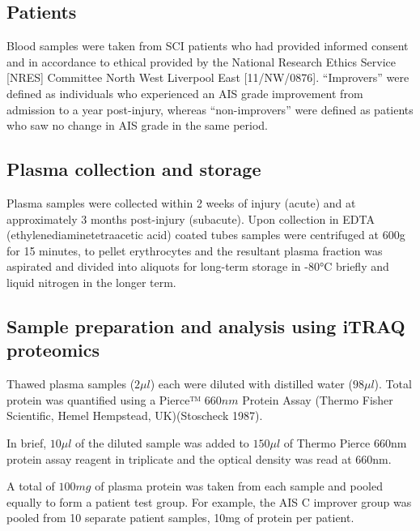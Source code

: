 \documentclass[9pt,lineno]{elife}
\begin{document}
\hypertarget{patients}{%
\subsection{Patients}\label{patients}}

Blood samples were taken from SCI patients who had provided informed consent and in accordance to ethical provided by the National Research Ethics Service {[}NRES{]} Committee North West Liverpool East {[}11/NW/0876{]}. ``Improvers'' were defined as individuals who experienced an AIS grade improvement from admission to a year post-injury, whereas ``non-improvers'' were defined as patients who saw no change in AIS grade in the same period.

\hypertarget{plasma-collection-and-storage}{%
\subsection{Plasma collection and storage}\label{plasma-collection-and-storage}}

Plasma samples were collected within 2 weeks of injury (acute) and at approximately 3 months post-injury (subacute). Upon collection in EDTA (ethylenediaminetetraacetic acid) coated tubes samples were centrifuged at 600g for 15 minutes, to pellet erythrocytes and the resultant plasma fraction was aspirated and divided into aliquots for long-term storage in -80°C briefly and liquid nitrogen in the longer term.

\hypertarget{itraq-sample-prep}{%
\subsection{Sample preparation and analysis using iTRAQ proteomics}\label{itraq-sample-prep}}

Thawed plasma samples (\(2\mu l\)) each were diluted with distilled water (\(98\mu l\)). Total protein was quantified using a Pierce™ \(660 nm\) Protein Assay (Thermo Fisher Scientific, Hemel Hempstead, UK)(Stoscheck 1987).

In brief, \(10\mu l\) of the diluted sample was added to \(150\mu l\) of Thermo Pierce 660nm protein assay reagent in triplicate and the optical density was read at 660nm.

A total of \(100 mg\) of plasma protein was taken from each sample and pooled equally to form a patient test group.
For example, the AIS C improver group was pooled from 10 separate patient samples, 10mg of protein per patient.
\end{document}
